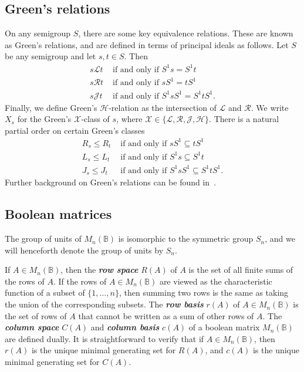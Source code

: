 \documentclass[11pt]{article}
\newcommand{\defn}[1]{\textbf{\textit{#1}}}
\numberwithin{equation}{section}
\newcommand{\B}{\mathbb{B}}
\newcommand{\Bn}{M_n(\B)}
\renewcommand{\L}{\mathscr{L}}
\newcommand{\R}{\mathscr{R}}
\newcommand{\J}{\mathscr{J}}
\renewcommand{\H}{\mathscr{H}}
\begin{document}
\subsection{Green's relations}
On any semigroup $S$, there are some key equivalence relations. These are known
as Green's relations, and are defined in terms of principal ideals as follows.
Let $S$ be any semigroup and let $s, t \in S$. Then
\begin{align*}
  s \L t &\text{ if and only if } S^1 s = S^1 t \\
  s \R t &\text{ if and only if } s S^1 = t S^1 \\
  s \J t &\text{ if and only if } S^1 s S^1 = S^1 t S^1.
\end{align*}
Finally, we define Green's $\H$-relation as the intersection of $\L$ and $\R$.
We write $X_s$ for the Green's $\mathcal{X}$-class of $s$, where
$\mathcal{X} \in \{\L, \R, \J, \H\}$.
There is a natural partial order on certain Green's classes
\begin{align*}
  R_s \leq R_t &\text{ if and only if } sS^1 \subseteq tS^1 \\
  L_s \leq L_t &\text{ if and only if } S^1s \subseteq S^1t \\
  J_s \leq J_t &\text{ if and only if } S^1 s S^1 \subseteq S^1 t S^1.
\end{align*}
Further background on Green's relations can be found in~\cite{Howie1995aa}.

\subsection{Boolean matrices}
The group of units of $\Bn$ is isomorphic to the symmetric group $S_n$, and we
will henceforth denote the group of units by $S_n$.

If $A \in \Bn$, then the \defn{row space} $R(A)$ of $A$ is the set of 
all finite sums of the rows of $A$. If the rows of $A\in \Bn$ are viewed as
the characteristic function of a subset of $\{1, \ldots, n\}$, then summing two
rows is the same as taking the union of the corresponding subsets.  The
\defn{row basis} $r(A)$ of $A\in \Bn$ is the set of rows of $A$ that cannot be
written as a sum of other rows of $A$. The \defn{column space}
$C(A)$ and \defn{column basis} $c(A)$ of a boolean matrix $\Bn$ are defined
dually. It is straightforward to verify that if $A \in \Bn$, then $r(A)$ is the
unique minimal generating set for $R(A)$, and $c(A)$ is the unique minimal
generating set for $C(A)$. 
\end{document}
